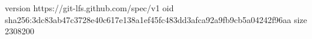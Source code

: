 version https://git-lfs.github.com/spec/v1
oid sha256:3dc83ab47c3728e40c617e138a1ef45fc483dd3afca92a9fb9cb5a04242f96aa
size 2308200
